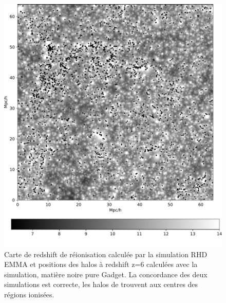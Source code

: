 \begin{figure}
		\centering
        \includegraphics[width=.95\linewidth]{img/05/maphaloh.pdf} 
        \caption[Carte de redshifts et halos à z=6]{Carte de redshift de réionisation calculée par la simulation \ac{RHD} EMMA et positions des halos à redshift z=6 calculées avec la simulation, matière noire pure Gadget.
        La concordance des deux simulations est correcte, les halos de trouvent aux centres des régions ionisées.
		\label{fig:zmapcomp}}
\end{figure}




